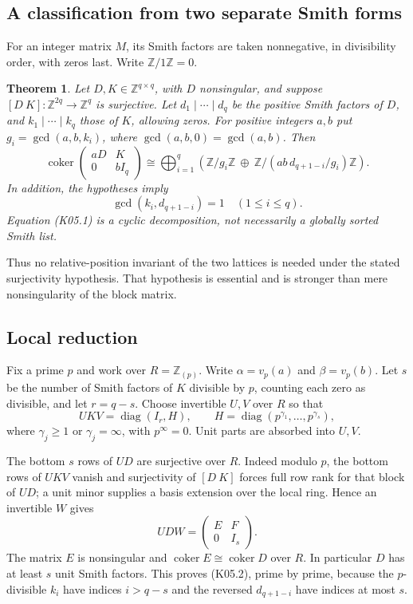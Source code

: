 \documentclass[11pt,a4paper]{article}
\newtheorem{theorem}{Theorem}[section]
\theoremstyle{definition}\newtheorem{definition}[theorem]{Definition}
\theoremstyle{remark}\newtheorem{remark}[theorem]{Remark}
\newcommand{\Z}{\mathbb Z}\newcommand{\Q}{\mathbb Q}\newcommand{\F}{\mathbb F}
\DeclareMathOperator{\coker}{coker}\DeclareMathOperator{\diag}{diag}\DeclareMathOperator{\rank}{rank}
\numberwithin{equation}{section}
\begin{document}
\subsection{A classification from two separate Smith forms}\label{K05-sec-1}
For an integer matrix $M$, its Smith factors are taken nonnegative, in divisibility order, with zeros last. Write $\Z/1\Z=0$.
\begin{theorem}\label{K05-main}
Let $D,K\in\Z^{q\times q}$, with $D$ nonsingular, and suppose $[D\ K]:\Z^{2q}\to\Z^q$ is surjective. Let $d_1\mid\cdots\mid d_q$ be the positive Smith factors of $D$, and $k_1\mid\cdots\mid k_q$ those of $K$, allowing zeros. For positive integers $a,b$ put $g_i=\gcd(a,b,k_i)$, where $\gcd(a,b,0)=\gcd(a,b)$. Then
\[
 \coker\begin{pmatrix}aD&K\\0&bI_q\end{pmatrix}
 \cong\bigoplus_{i=1}^q\left(
 \Z/g_i\Z\ \oplus\ \Z/(ab\,d_{q+1-i}/g_i)\Z\right).          \tag{K05.1}
\]
In addition, the hypotheses imply
\[
 \gcd(k_i,d_{q+1-i})=1\quad(1\leq i\leq q).                  \tag{K05.2}
\]
Equation (K05.1) is a cyclic decomposition, not necessarily a globally sorted Smith list.
\end{theorem}
Thus no relative-position invariant of the two lattices is needed under the stated surjectivity hypothesis. That hypothesis is essential and is stronger than mere nonsingularity of the block matrix.

\subsection{Local reduction}\label{K05-sec-2}
Fix a prime $p$ and work over $R=\Z_{(p)}$. Write $\alpha=v_p(a)$ and $\beta=v_p(b)$. Let $s$ be the number of Smith factors of $K$ divisible by $p$, counting each zero as divisible, and let $r=q-s$. Choose invertible $U,V$ over $R$ so that
\[
 UKV=\diag(I_r,H),\qquad
 H=\diag(p^{\gamma_1},\ldots,p^{\gamma_s}),                    \tag{K05.3}
\]
where $\gamma_j\geq1$ or $\gamma_j=\infty$, with $p^\infty=0$. Unit parts are absorbed into $U,V$.

The bottom $s$ rows of $UD$ are surjective over $R$. Indeed modulo $p$, the bottom rows of $UKV$ vanish and surjectivity of $[D\ K]$ forces full row rank for that block of $UD$; a unit minor supplies a basis extension over the local ring. Hence an invertible $W$ gives
\[
 UDW=\begin{pmatrix}E&F\\0&I_s\end{pmatrix}.                 \tag{K05.4}
\]
The matrix $E$ is nonsingular and $\coker E\cong\coker D$ over $R$. In particular $D$ has at least $s$ unit Smith factors. This proves (K05.2), prime by prime, because the $p$-divisible $k_i$ have indices $i>q-s$ and the reversed $d_{q+1-i}$ have indices at most $s$.
\end{document}
